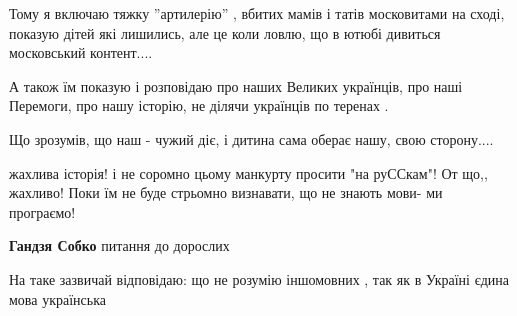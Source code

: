 \begin{itemize}
\begin{itemize}
Тому я включаю тяжку ''артилерію'' , вбитих мамів і татів московитами на сході,
показую дітей які лишились, але це коли ловлю, що в ютюбі дивиться московський
контент....

А також їм показую і розповідаю про наших Великих українців, про наші Перемоги,
про нашу історію, не ділячи українців по теренах .

Що зрозумів, що наш - чужий діє, і дитина сама оберає нашу, свою сторону....

\end{itemize} %

жахлива історія!
і не соромно цьому манкурту просити "на руССкам"!
От що,, жахливо!
Поки їм не буде стрьомно визнавати, що не знають мови- ми програємо!

\begin{itemize} %
\textbf{Гандзя Собко} питання до дорослих
\end{itemize} %




На таке зазвичай відповідаю: що не розумію іншомовних , так як в Україні єдина
мова українська

\end{itemize} %
